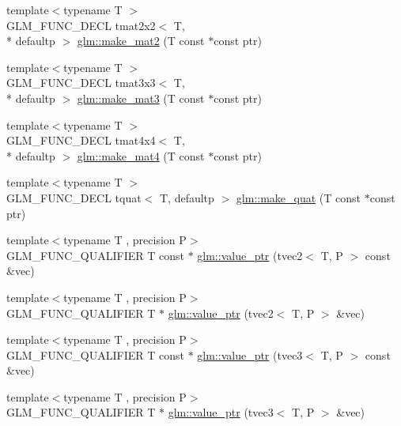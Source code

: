 \begin{DoxyCompactItemize}
\item 
{\footnotesize template$<$typename T $>$ }\\G\-L\-M\-\_\-\-F\-U\-N\-C\-\_\-\-D\-E\-C\-L tmat2x2$<$ T, \\*
defaultp $>$ \hyperlink{group__gtc__type__ptr_ga52a16e333fef7e33ca740779482a8693}{glm\-::make\-\_\-mat2} (T const $\ast$const ptr)
\item 
{\footnotesize template$<$typename T $>$ }\\G\-L\-M\-\_\-\-F\-U\-N\-C\-\_\-\-D\-E\-C\-L tmat3x3$<$ T, \\*
defaultp $>$ \hyperlink{group__gtc__type__ptr_gac2bc10c519ffc8db9e24f325f23787ea}{glm\-::make\-\_\-mat3} (T const $\ast$const ptr)
\item 
{\footnotesize template$<$typename T $>$ }\\G\-L\-M\-\_\-\-F\-U\-N\-C\-\_\-\-D\-E\-C\-L tmat4x4$<$ T, \\*
defaultp $>$ \hyperlink{group__gtc__type__ptr_ga2c6e6d457cb932e1ce683e4f690a6f60}{glm\-::make\-\_\-mat4} (T const $\ast$const ptr)
\item 
{\footnotesize template$<$typename T $>$ }\\G\-L\-M\-\_\-\-F\-U\-N\-C\-\_\-\-D\-E\-C\-L tquat$<$ T, defaultp $>$ \hyperlink{group__gtc__type__ptr_gaadafb6600af2633e4c98cc64c72f5269}{glm\-::make\-\_\-quat} (T const $\ast$const ptr)
\item 
{\footnotesize template$<$typename T , precision P$>$ }\\G\-L\-M\-\_\-\-F\-U\-N\-C\-\_\-\-Q\-U\-A\-L\-I\-F\-I\-E\-R T const $\ast$ \hyperlink{group__gtc__type__ptr_gafb01331238d8899dde700cb9b5dc6ef3}{glm\-::value\-\_\-ptr} (tvec2$<$ T, P $>$ const \&vec)
\item 
{\footnotesize template$<$typename T , precision P$>$ }\\G\-L\-M\-\_\-\-F\-U\-N\-C\-\_\-\-Q\-U\-A\-L\-I\-F\-I\-E\-R T $\ast$ \hyperlink{group__gtc__type__ptr_gabd3cc713184a2093862605f5f0abb8a4}{glm\-::value\-\_\-ptr} (tvec2$<$ T, P $>$ \&vec)
\item 
{\footnotesize template$<$typename T , precision P$>$ }\\G\-L\-M\-\_\-\-F\-U\-N\-C\-\_\-\-Q\-U\-A\-L\-I\-F\-I\-E\-R T const $\ast$ \hyperlink{group__gtc__type__ptr_gac04db5d9c05bd3d50140f34f8695a08c}{glm\-::value\-\_\-ptr} (tvec3$<$ T, P $>$ const \&vec)
\item 
{\footnotesize template$<$typename T , precision P$>$ }\\G\-L\-M\-\_\-\-F\-U\-N\-C\-\_\-\-Q\-U\-A\-L\-I\-F\-I\-E\-R T $\ast$ \hyperlink{group__gtc__type__ptr_gab2832ef9f1d2571fab5c7ae661e11e75}{glm\-::value\-\_\-ptr} (tvec3$<$ T, P $>$ \&vec)

\end{DoxyCompactItemize}
